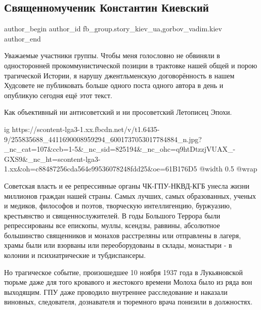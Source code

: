  
 
 
 
 
 
\subsection{Священномученик Константин Киевский}
\label{sec:10_11_2021.fb.fb_group.story_kiev_ua.2.konstantin_kievskij_muchenik}
 
\ifcmt
 author_begin
   author_id fb_group.story_kiev_ua,gorbov_vadim.kiev
 author_end
\fi

Уважаемые участники группы. Чтобы меня голословно не обвиняли в односторонней
прокоммунистической позиции в трактовке нашей общей и порою трагической
Истории, я нарушу джентльменскую договорённость в нашем Худсовете  не
публиковать больше одного поста одного автора в день и опубликую сегодня ещё
этот текст. 

Как объективный ни антисоветский и ни просоветский Летописец Эпохи. 

\ifcmt
  ig https://scontent-lga3-1.xx.fbcdn.net/v/t1.6435-9/255835688_4411690008959294_6001737053017784884_n.jpg?_nc_cat=107&ccb=1-5&_nc_sid=825194&_nc_ohc=q9htDtzzjVUAX_-GXS9&_nc_ht=scontent-lga3-1.xx&oh=c88487256cda564e99536078248fdd25&oe=61B176D5
  @width 0.5
  @wrap 
\fi

Советская власть и ее репрессивные органы ЧК-ГПУ-НКВД-КГБ унесла жизни
миллионов граждан нашей страны. Самых лучших, самых образованных, ученых и
медиков, философов и поэтов, творческую интеллигенцию, буржуазию,
крестьянство и священнослужителей. В годы Большого Террора были
репрессированы все епископы, муллы, ксендзы, раввины, абсолютное
большинство священников и монахов расстреляны или отправлены в лагеря,
храмы были или взорваны или переоборудованы в склады, монастыри - в колонии
и психиатрические и тубдиспансеры. 

Но трагическое событие, произошедшее 10 ноября 1937 года в Лукьяновской
тюрьме даже для того кровавого и жестокого времени Молоха было из ряда вон
выходящим. ГПУ даже проводило внутреннее расследование и наказали виновных,
следователя, дознавателя и тюремного врача понизили в должностях. 


